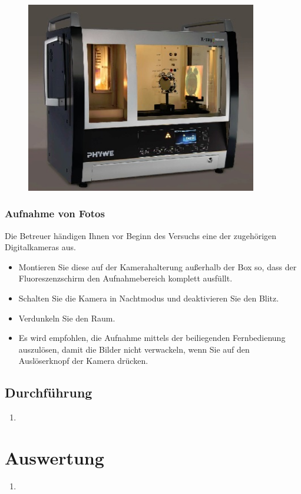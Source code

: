 \begin{figure}[h!]
	\begin{center}
		\includegraphics[width=0.90\textwidth]{figures/roentgen-ueberblick.jpg}
	\end{center}
\end{figure}

\subsubsection{Aufnahme von Fotos}

Die Betreuer händigen Ihnen vor Beginn des Versuchs eine der zugehörigen Digitalkameras aus. 
\begin{itemize}
	\item Montieren Sie diese auf der Kamerahalterung außerhalb der Box so, dass der Fluoreszenzschirm den Aufnahmebereich komplett ausfüllt.
	\item Schalten Sie die Kamera in Nachtmodus und deaktivieren Sie den Blitz.
	\item Verdunkeln Sie den Raum.
	\item Es wird empfohlen, die Aufnahme mittels der beiliegenden Fernbedienung auszulösen, damit die Bilder nicht verwackeln, wenn Sie auf den Auslöserknopf der Kamera drücken.
\end{itemize}

\subsection{Durchführung}

\begin{enumerate}
	\item 
\end{enumerate}


\section{Auswertung} 

\begin{enumerate}
	\item
\end{enumerate}
